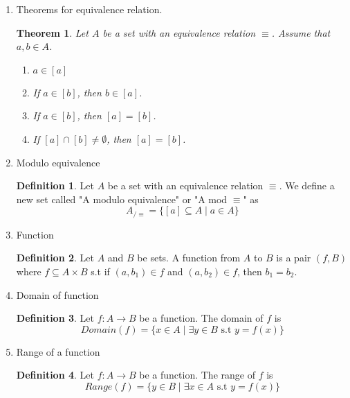 \documentclass{article}
\theoremstyle{claim}
\newtheorem{theorem}{Theorem}[section]
\theoremstyle{definition}
\newtheorem{definition}{Definition}
\begin{document}
\begin{enumerate}
    \item[41.] Theorems for equivalence relation.
        \begin{theorem}
            Let $A$ be a set with an equivalence relation $\equiv$. Assume that $a, b \in A$.
            \begin{enumerate}
                \item[1.] $a \in [a]$
                \item[2.] If $a \in [b]$, then $b \in [a]$.
                \item[3.] If $a \in [b]$, then $[a] = [b]$.
                \item[4.] If $[a] \cap [b] \ne \emptyset$, then $[a] = [b]$.
            \end{enumerate}
        \end{theorem}

    \item[42.] Modulo equivalence
        \begin{definition}
            Let $A$ be a set with an equivalence relation $\equiv$. We define a new set called "A modulo equivalence" or "A mod $\equiv$" as
            \begin{equation*}
                A_{/ \equiv} = \{ [a] \subseteq A \mid a \in A\}
            \end{equation*}
        \end{definition}

    \item[43.] Function
        \begin{definition}
            Let $A$ and $B$ be sets. A function from $A$ to $B$ is a pair $(f, B)$ where $f \subseteq A \times B$ s.t if $(a, b_1) \in f$ and $(a, b_2) \in f$, then $b_1 = b_2$.
        \end{definition}

    \item[44.] Domain of function
        \begin{definition}
            Let $f: A \rightarrow B$ be a function. The domain of $f$ is
            \begin{equation*}
                Domain(f) = \{ x \in A \mid \exists y \in B \text{ s.t } y = f(x) \}
            \end{equation*}
        \end{definition}

    \item[45.] Range of a function
        \begin{definition}
            Let $f: A \rightarrow B$ be a function. The range of $f$ is
            \begin{equation*}
                Range(f) = \{ y \in B \mid \exists x \in A \text{ s.t } y = f(x) \}
            \end{equation*}
        \end{definition}


\end{enumerate}
\end{document}
